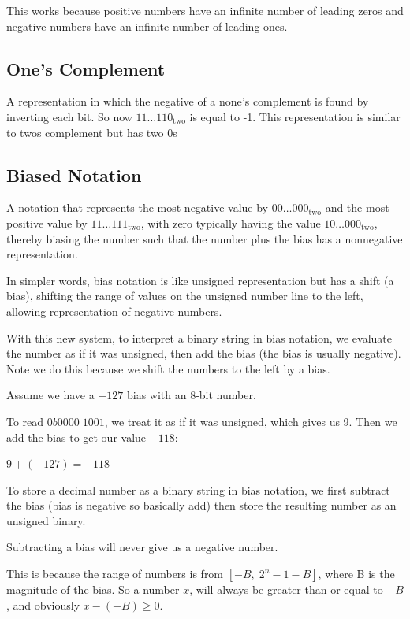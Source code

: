 \documentclass[12pt]{article}
\begin{document}
This works because positive numbers have an infinite number of leading zeros and negative numbers have an infinite number of leading ones.

\subsection*{One's Complement}
A representation in which the negative of a none's complement is found by inverting each bit. So now $11\dots110_{\text{two}}$ is equal to -1. This representation is similar to twos complement but has two 0s
\subsection*{Biased Notation}
A notation that represents the most negative value by $00 \ldots000_{\text{two}}$ and the most positive value by $11 \ldots 111_{\text{two}}$, with zero typically having the value $10 \ldots000_{\text{two}}$, thereby biasing the number such that the number plus the bias has a nonnegative representation.

In simpler words, bias notation is like unsigned representation but has a shift (a bias), shifting the range of values on the unsigned number line to the left, allowing representation of negative numbers.

With this new system, to interpret a binary string in bias notation, we evaluate the number as if it was unsigned, then add the bias (the bias is usually negative). Note we do this because we shift the numbers to the left by a bias.

\begin{example}
    Assume we have a $-127$ bias with an 8-bit number.

    To read $0b0000 \; 1001$, we treat it as if it was unsigned, which gives us 9. Then we add the bias to get our value $-118$:

    $9 + (-127) = -118$
\end{example}

To store a decimal number as a binary string in bias notation, we first subtract the bias (bias is negative so basically add) then store the resulting number as an unsigned binary.

\begin{lemma}
    Subtracting a bias will never give us a negative number.

    This is because the range of numbers is from $[-B, \;  2^n - 1 - B]$, where B is the magnitude of the bias. So a number $x$, will always be greater than or equal to $-B$, and obviously $x - (-B) \ge 0$.
\end{lemma}
\end{document}
